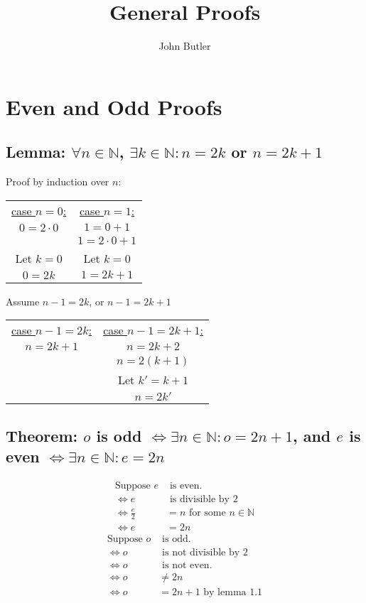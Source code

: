 \documentclass[11pt, oneside]{article}   	%
\title{General Proofs}
\author{John Butler}
\date{}							%
\begin{document}
\maketitle

\tableofcontents
\newpage

\section{Even and Odd Proofs}
	\subsection{Lemma: $\forall n \in \mathbb{N}$, $\exists k \in \mathbb{N}: n = 2k$ or $n =2k + 1$}
		Proof by induction over $n$:
		\begin{center}
		\begin{tabular}{c|c}
			\underline{case $n = 0$:}&\underline{case $n = 1$:}\\
			$0 = 2\cdot 0$&$1 = 0 + 1$\\
			&$1 = 2\cdot 0 + 1$\\
			Let $k  =0$& Let $k = 0$\\
			$0 = 2k$&$1 = 2k + 1$
		\end{tabular}
		\end{center}
			Assume $n - 1 = 2k$, or $n - 1 = 2k + 1$\\
		\begin{center}
		\begin{tabular}{c|c}
			\underline{case $n - 1 = 2k$:}&\underline{case $n - 1 = 2k + 1$:}\\
			$n = 2k + 1$&$n = 2k + 2$\\
			&$n = 2(k + 1)$\\
			&Let $k' = k + 1$\\
			&$n = 2k'$
		\end{tabular}
		\end{center}

	\subsection{Theorem: $o$ is odd $\iff \exists n \in \mathbb{N} : o =2n + 1$, and $e$ is even $\iff \exists n \in \mathbb{N} : e = 2n$}
		\begin{align*}
			\text{Suppose } e & \text{ is even.}\\
			\iff e & \text{ is divisible by } 2\\
			\iff \frac{e}{2} &= n \text{ for some } n \in \mathbb{N}\\
			\iff e &= 2n
		\end{align*}
		\begin{align*}
			\text{Suppose } o & \text{ is odd.}\\
			\iff o & \text{ is not divisible by } 2\\
			\iff o& \text{ is not even.}\\
			\iff o &\ne 2n\\
			\iff o &= 2n + 1 \text{ by lemma 1.1}
		\end{align*}
\end{document}
